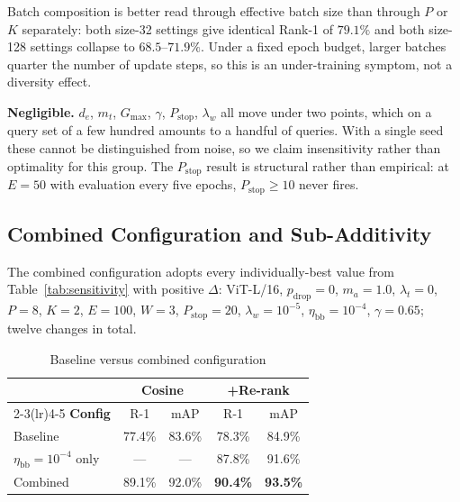 \documentclass[conference]{IEEEtran}
\begin{document}
Batch composition is better read through effective batch size than through $P$ or $K$
separately: both size-32 settings give identical Rank-1 of $79.1\%$ and both size-128
settings collapse to $68.5$--$71.9\%$. Under a fixed epoch budget, larger batches quarter
the number of update steps, so this is an under-training symptom, not a diversity effect.

\textbf{Negligible.} $d_e$, $m_t$, $G_{\max}$, $\gamma$, $P_{\text{stop}}$, $\lambda_w$
all move under two points, which on a query set of a few hundred amounts to a handful of
queries. With a single seed these cannot be distinguished from noise, so we claim
insensitivity rather than optimality for this group. The $P_{\text{stop}}$ result is
structural rather than empirical: at $E=50$ with evaluation every five epochs,
$P_{\text{stop}} \geq 10$ never fires.

\subsection{Combined Configuration and Sub-Additivity}

The combined configuration adopts every individually-best value from
Table~\ref{tab:sensitivity} with positive $\Delta$: ViT-L/16, $p_{\text{drop}}=0$,
$m_a=1.0$, $\lambda_t=0$, $P=8$, $K=2$, $E=100$, $W=3$, $P_{\text{stop}}=20$,
$\lambda_w=10^{-5}$, $\eta_{\text{bb}}=10^{-4}$, $\gamma=0.65$; twelve changes in total.

\begin{table}[t]
  \caption{Baseline versus combined configuration}
  \label{tab:combined}
  \centering
  \footnotesize
  \begin{tabular}{@{}lcccc@{}}
    \toprule
                                    & \multicolumn{2}{c}{\textbf{Cosine}} & \multicolumn{2}{c}{\textbf{+Re-rank}}                                     \\
    \cmidrule(lr){2-3}\cmidrule(lr){4-5}
    \textbf{Config}                 & R-1                                 & mAP                                   & R-1             & mAP             \\
    \midrule
    Baseline                        & 77.4\%                              & 83.6\%                                & 78.3\%          & 84.9\%          \\
    $\eta_{\text{bb}}=10^{-4}$ only & ---                                 & ---                                   & 87.8\%          & 91.6\%          \\
    Combined                        & 89.1\%                              & 92.0\%                                & \textbf{90.4\%} & \textbf{93.5\%} \\
    \bottomrule
  \end{tabular}
\end{table}
\end{document}
